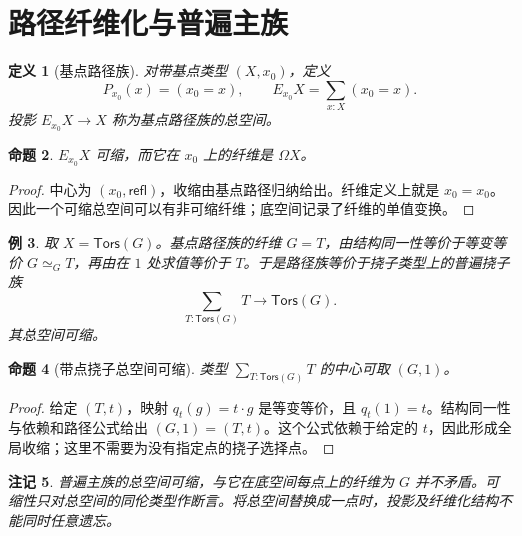 \documentclass[12pt,oneside,openany,fontset=none]{ctexbook}
\theoremstyle{cn}
\newtheorem{definition}{定义}[chapter]
\newtheorem{example}[definition]{例}
\newtheorem{proposition}[definition]{命题}
\newtheorem{remark}[definition]{注记}
\numberwithin{equation}{chapter}
\newcommand{\refl}{\mathsf{refl}}
\newcommand{\Tors}{\mathsf{Tors}}
\begin{document}
\section{路径纤维化与普遍主族}
\begin{definition}[基点路径族]
对带基点类型 $(X,x_0)$，定义
\[
P_{x_0}(x)=(x_0=x),
\qquad
E_{x_0}X=\sum_{x:X}(x_0=x).
\]
投影 $E_{x_0}X\to X$ 称为基点路径族的总空间。
\end{definition}
\begin{proposition}
$E_{x_0}X$ 可缩，而它在 $x_0$ 上的纤维是 $\Omega X$。
\end{proposition}
\begin{proof}
中心为 $(x_0,\refl)$，收缩由基点路径归纳给出。纤维定义上就是 $x_0=x_0$。因此一个可缩总空间可以有非可缩纤维；底空间记录了纤维的单值变换。
\end{proof}
\begin{example}
取 $X=\Tors(G)$。基点路径族的纤维 $G=T$，由结构同一性等价于等变等价 $G\simeq_G T$，再由在 $1$ 处求值等价于 $T$。于是路径族等价于挠子类型上的普遍挠子族
\[
\sum_{T:\Tors(G)}T\longrightarrow\Tors(G).
\]
其总空间可缩。
\end{example}
\begin{proposition}[带点挠子总空间可缩]
类型 $\sum_{T:\Tors(G)}T$ 的中心可取 $(G,1)$。
\end{proposition}
\begin{proof}
给定 $(T,t)$，映射 $q_t(g)=t\cdot g$ 是等变等价，且 $q_t(1)=t$。结构同一性与依赖和路径公式给出 $(G,1)=(T,t)$。这个公式依赖于给定的 $t$，因此形成全局收缩；这里不需要为没有指定点的挠子选择点。
\end{proof}
\begin{remark}
普遍主族的总空间可缩，与它在底空间每点上的纤维为 $G$ 并不矛盾。可缩性只对总空间的同伦类型作断言。将总空间替换成一点时，投影及纤维化结构不能同时任意遗忘。
\end{remark}
\end{document}

